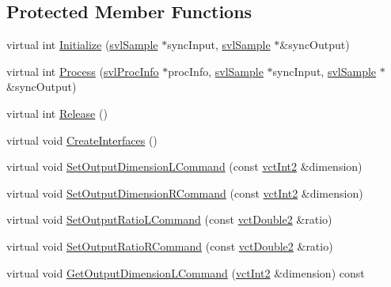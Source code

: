 \subsection*{Protected Member Functions}
\begin{DoxyCompactItemize}
\item 
virtual int \hyperlink{classsvl_filter_image_resizer_a32eef83eb1adb95d82d078e97f06aa42}{Initialize} (\hyperlink{classsvl_sample}{svl\+Sample} $\ast$sync\+Input, \hyperlink{classsvl_sample}{svl\+Sample} $\ast$\&sync\+Output)
\item 
virtual int \hyperlink{classsvl_filter_image_resizer_a50dac8050f4a32a277ce8a961cc63c76}{Process} (\hyperlink{structsvl_proc_info}{svl\+Proc\+Info} $\ast$proc\+Info, \hyperlink{classsvl_sample}{svl\+Sample} $\ast$sync\+Input, \hyperlink{classsvl_sample}{svl\+Sample} $\ast$\&sync\+Output)
\item 
virtual int \hyperlink{classsvl_filter_image_resizer_afb55d1d36affb2a11f0f999f5ccc04b1}{Release} ()
\item 
virtual void \hyperlink{classsvl_filter_image_resizer_a979807274e5816592114a4fffd0bb71b}{Create\+Interfaces} ()
\item 
virtual void \hyperlink{classsvl_filter_image_resizer_aacbed035fbd4880b683a6c18158ccf99}{Set\+Output\+Dimension\+L\+Command} (const \hyperlink{vct_fixed_size_vector_types_8h_add8c88eb6a432b15f14b866b9c35325f}{vct\+Int2} \&dimension)
\item 
virtual void \hyperlink{classsvl_filter_image_resizer_aada166d67fddd55ad5391d70721b6e9c}{Set\+Output\+Dimension\+R\+Command} (const \hyperlink{vct_fixed_size_vector_types_8h_add8c88eb6a432b15f14b866b9c35325f}{vct\+Int2} \&dimension)
\item 
virtual void \hyperlink{classsvl_filter_image_resizer_a716ae9051292140956e44549f8beb6c2}{Set\+Output\+Ratio\+L\+Command} (const \hyperlink{vct_fixed_size_vector_types_8h_afc0fdcc41cbe8b043747612501610812}{vct\+Double2} \&ratio)
\item 
virtual void \hyperlink{classsvl_filter_image_resizer_a18e26407cf94f45d99e401e131c5e6e7}{Set\+Output\+Ratio\+R\+Command} (const \hyperlink{vct_fixed_size_vector_types_8h_afc0fdcc41cbe8b043747612501610812}{vct\+Double2} \&ratio)
\item 
virtual void \hyperlink{classsvl_filter_image_resizer_ae730b292a9b54e996f65b0b8b09d7803}{Get\+Output\+Dimension\+L\+Command} (\hyperlink{vct_fixed_size_vector_types_8h_add8c88eb6a432b15f14b866b9c35325f}{vct\+Int2} \&dimension) const 
\item 

\end{DoxyCompactItemize}
